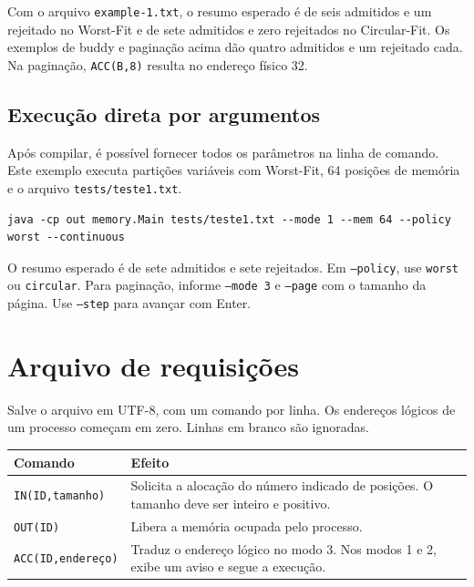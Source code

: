 \documentclass[11pt,a4paper]{article}
\newcommand{\cmd}[1]{\texttt{#1}}
\begin{document}
Com o arquivo \cmd{example-1.txt}, o resumo esperado é de seis admitidos
e um rejeitado no Worst-Fit e de sete admitidos e zero rejeitados no
Circular-Fit. Os exemplos de buddy e paginação acima dão quatro admitidos
e um rejeitado cada. Na paginação, \cmd{ACC(B,8)} resulta no endereço
físico 32.

\subsection*{Execução direta por argumentos}

Após compilar, é possível fornecer todos os parâmetros na linha de
comando. Este exemplo executa partições variáveis com Worst-Fit, 64
posições de memória e o arquivo \cmd{tests/teste1.txt}.

\begin{small}
\begin{verbatim}
java -cp out memory.Main tests/teste1.txt --mode 1 --mem 64 --policy worst --continuous
\end{verbatim}
\end{small}

O resumo esperado é de sete admitidos e sete rejeitados. Em
\cmd{--policy}, use \cmd{worst} ou \cmd{circular}. Para paginação,
informe \cmd{--mode 3} e \cmd{--page} com o tamanho da página.
Use \cmd{--step} para avançar com Enter.

\clearpage

\section{Arquivo de requisições}

Salve o arquivo em UTF-8, com um comando por linha. Os endereços lógicos
de um processo começam em zero. Linhas em branco são ignoradas.

\begin{center}
\small
\begin{tabularx}{\linewidth}{@{}lX@{}}
\toprule
Comando & Efeito \\
\midrule
\cmd{IN(ID,tamanho)} & Solicita a alocação do número indicado de posições.
O tamanho deve ser inteiro e positivo. \\
\cmd{OUT(ID)} & Libera a memória ocupada pelo processo. \\
\cmd{ACC(ID,endereço)} & Traduz o endereço lógico no modo 3.
Nos modos 1 e 2, exibe um aviso e segue a execução. \\
\bottomrule
\end{tabularx}
\end{center}
\end{document}
